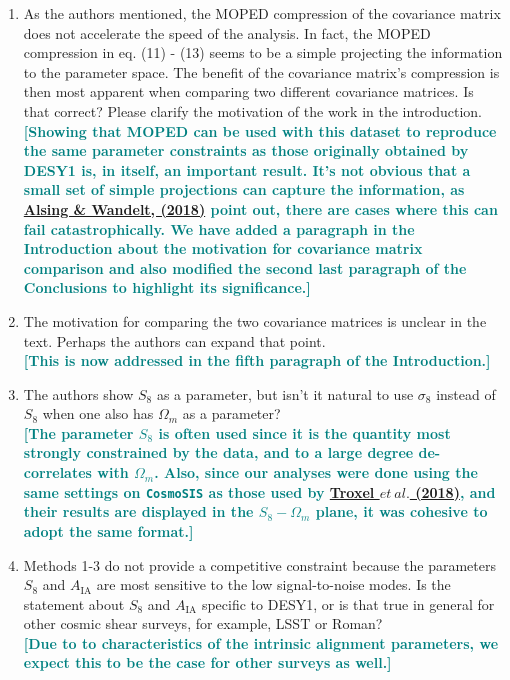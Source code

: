 \documentclass{article}
\newcommand\reply[1]{{\bf {\textcolor{teal}{[#1]}}}}
\begin{document}
	\begin{enumerate}
	\item As the authors mentioned, the MOPED compression of the covariance matrix does not accelerate the speed of the analysis. In fact, the MOPED compression in eq. (11) - (13) seems to be a simple projecting the information to the parameter space. The benefit of the covariance matrix's compression is then most apparent when comparing two different covariance matrices. Is that correct? Please clarify the motivation of the work in the introduction. \\
		\reply{Showing that MOPED can be used with this dataset to reproduce the same parameter constraints as those originally obtained by DESY1 is, in itself, an important result. It's not obvious that a small set of simple projections can capture the information, as \href{https://doi.org/10.1093/mnrasl/sly029}{Alsing \& Wandelt, (2018)} point out, there are cases where this can fail catastrophically. We have added a paragraph in the Introduction about the motivation for covariance matrix comparison and also modified the second last paragraph of the Conclusions to highlight its significance.}
	
	\item The motivation for comparing the two covariance matrices is unclear in the text. Perhaps the authors can expand that point. \\	
		\reply{This is now addressed in the fifth paragraph of  the Introduction.}
	
	\item The authors show $S_8$ as a parameter, but isn't it natural to use $\sigma_8$ instead of $S_8$ when one also has $\Omega_m$ as a parameter? \\
		\reply{The parameter $S_8$ is often used since it is the quantity most strongly constrained by the data, and to a large degree de-correlates with $\Omega_m$. Also, since our analyses were done using the same settings on \texttt{CosmoSIS} as those used by \href{https://doi.org/10.1103/PhysRevD.98.043528}{Troxel $et\ al.$ (2018)}, and their results are displayed in the $S_8 - \Omega_m$ plane, it was cohesive to adopt the same format.}
	
	\item Methods 1-3 do not provide a competitive constraint because the parameters $S_8$ and $A_{\text{IA}}$ are most sensitive to the low signal-to-noise modes. Is the statement about $S_8$ and $A_{\text{IA}}$ specific to DESY1, or is that true in general for other cosmic shear surveys, for example, LSST or Roman? \\	
		\reply{Due to to characteristics of the intrinsic alignment parameters, we expect this to be the case for other surveys as well.}
	\end{enumerate}
	
\end{document}
